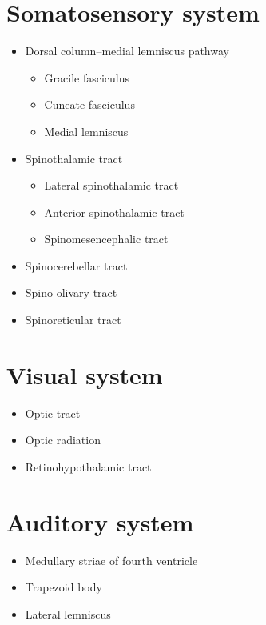 \hypertarget{somatosensory-system}{%
\section{Somatosensory system}\label{somatosensory-system}}

\begin{itemize}
\tightlist
\item
  Dorsal column--medial lemniscus pathway

  \begin{itemize}
  \tightlist
  \item
    Gracile fasciculus
  \item
    Cuneate fasciculus
  \item
    Medial lemniscus
  \end{itemize}
\item
  Spinothalamic tract

  \begin{itemize}
  \tightlist
  \item
    Lateral spinothalamic tract
  \item
    Anterior spinothalamic tract
  \item
    Spinomesencephalic tract
  \end{itemize}
\item
  Spinocerebellar tract
\item
  Spino-olivary tract
\item
  Spinoreticular tract
\end{itemize}

\hypertarget{visual-system}{%
\section{Visual system}\label{visual-system}}

\begin{itemize}
\tightlist
\item
  Optic tract
\item
  Optic radiation
\item
  Retinohypothalamic tract
\end{itemize}

\hypertarget{auditory-system}{%
\section{Auditory system}\label{auditory-system}}

\begin{itemize}
\tightlist
\item
  Medullary striae of fourth ventricle
\item
  Trapezoid body
\item
  Lateral lemniscus
\end{itemize}

